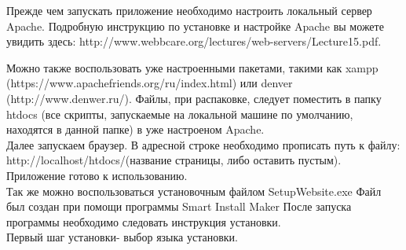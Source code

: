 \hspace{1.25cm}Прежде чем запускать приложение необходимо настроить локальный сервер Apache. Подробную инструкцию по установке и настройке Apache вы можете увидить здесь: 
http://www.webbcare.org/lectures/web-servers/Lecture15.pdf.

Можно также воспользовать уже настроенными пакетами, такими как xampp (https://www.apachefriends.org/ru/index.html) или denver \\
(http://www.denwer.ru/). 
Файлы, при распаковке, следует поместить в папку htdocs (все скрипты, запускаемые на локальной машине
по умолчанию, находятся в данной папке) в уже настроеном Apache.
\\
Далее запускаем браузер. В адресной строке необходимо прописать путь к файлу: http://localhost/htdocs/(название страницы, либо оставить пустым).
Приложение готово к использованию.\\
Так же можно воспользоваться установочным файлом SetupWebsite.exe
Файл был создан при помощи программы Smart Install Maker
После запуска программы необходимо следовать инструкция установки.
\\
Первый  шаг установки- выбор языка установки.

